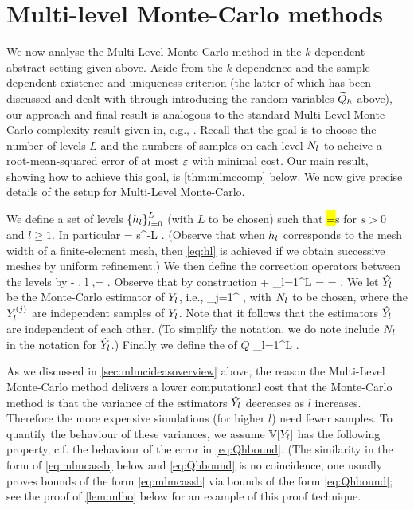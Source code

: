 \section{Multi-level Monte-Carlo methods}\label{sec:mlmcan}
We now analyse the Multi-Level Monte-Carlo method in the $k$-dependent abstract setting given above. Aside from the $k$-dependence and the sample-dependent existence and uniqueness criterion (the latter of which has been discussed and dealt with through introducing the random variables $\widetilde{Q}_{h}$ above), our approach and final result is analogous to the standard Multi-Level Monte-Carlo complexity result given in, e.g., \cite[Theorem 1]{ClGiScTe:11}. Recall that the goal is to choose the number of levels $L$ and the numbers of samples on each level $N_{l}$ to acheive a root-mean-squared error of at most $\varepsilon$ with minimal cost. Our main result, showing how to achieve this goal, is \cref{thm:mlmccomp} below. We now give precise details of the setup for Multi-Level Monte-Carlo.

We define a set of levels $\set{\hl}_{l=0}^L$ (with $L$ to be chosen) such that
\beq\label{eq:hl}
\hl =\frac{\hlmo}s
\eeq
for $s > 0$ and $l \geq 1$. In particular
\beq\label{eq:hL}
\hL = s^{-L} \hz.
\eeq
(Observe that when $h_{l}$ corresponds to the mesh width of a finite-element mesh, then \cref{eq:hl} is achieved if we obtain successive meshes by uniform refinement.) We then define the correction operators between the levels by
\beq\label{eq:Yldef}
\Yl \de \Qhltilde - \Qhlmotilde, l ,\quad \Yz = \Qhztilde.
\eeq
Observe that by construction
\beq\label{eq:expectationtelescope}
\EXP{\Yz} + \sum_{l=1}^L \EXP{\Yl} =  = \EXP{\QhLtilde}.
\eeq
We let $\hat{Y_{l}}$ be the Monte-Carlo estimator of $Y_{l}$, i.e.,
 \beq\label{eq:Ylhatdef}
\Ylhat \de {}\sum_{j=1}^{\Nl} \Ylj,
 \eeq
 with $N_{l}$ to be chosen, where the $Y_{l}^{(j)}$ are independent samples of $Y_{l}$. Note that it follows that the estimators $\hat{Y_{l}}$ are independent of each other. (To simplify the notation, we do note include $N_{l}$ in the notation for $\hat{Y_{l}}$.) Finally we define the  of $Q$
 \beqs
 \QhatMLhL \de \sum_{l=1}^L \Ylhat.
 \eeqs

 As we discussed in \cref{sec:mlmcideasoverview} above, the reason the Multi-Level Monte-Carlo method delivers a lower computational cost that the Monte-Carlo method is that the variance of the estimators $\hat{Y_{l}}$ decreases as $l$ increases. Therefore the more expensive simulations (for higher $l$) need fewer samples. To quantify the behaviour of these variances, we assume $\VAR{\Yl}$ has the following property, c.f. the behaviour of the error in \cref{eq:Qhbound}. (The similarity in the form of \cref{eq:mlmcassb} below and \cref{eq:Qhbound} is no coincidence, one usually proves bounds of the form \cref{eq:mlmcassb} via bounds of the form \cref{eq:Qhbound}; see the proof of \cref{lem:mlho} below for an example of this proof technique.

